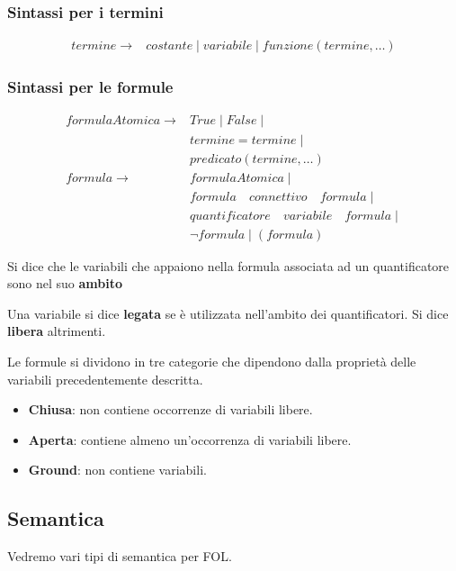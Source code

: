 \subsubsection{Sintassi per i termini}
\[
	\begin{array}{rl}
		termine \rightarrow & costante \mid variabile \mid funzione(termine, \dots)
	\end{array}
\]
\subsubsection{Sintassi per le formule}
\[
	\begin{array}{rl}
		formulaAtomica \rightarrow & True \mid False \mid                              \\
		                           & termine = termine \mid                            \\
		                           & predicato(termine, \dots)                         \\
		formula \rightarrow        & formulaAtomica \mid                               \\
		                           & formula \quad connettivo \quad formula \mid       \\
		                           & quantificatore \quad variabile \quad formula \mid \\
		                           & \lnot formula \mid (formula)
	\end{array}
\]

Si dice che le variabili che appaiono nella formula associata ad un quantificatore sono nel suo \textbf{ambito}

Una variabile si dice \textbf{legata} se \`e utilizzata nell'ambito dei quantificatori. Si dice \textbf{libera}
altrimenti.

Le formule si dividono in tre categorie che dipendono dalla propriet\`a delle variabili precedentemente descritta.
\begin{itemize}
	\item \textbf{Chiusa}: non contiene occorrenze di variabili libere.
	\item \textbf{Aperta}: contiene almeno un'occorrenza di variabili libere.
	\item \textbf{Ground}: non contiene variabili.
\end{itemize}

\subsection{Semantica}
Vedremo vari tipi di semantica per FOL.

